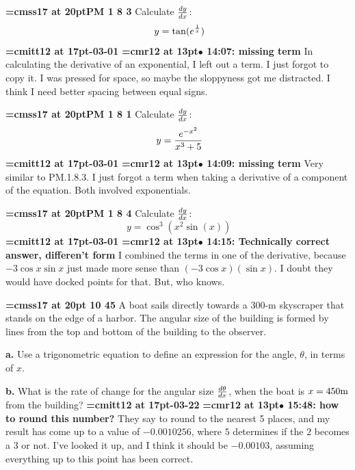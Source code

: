 {\medskip\noindent\bf\font\titlefont=cmss17 at 20pt\titlefont PM 1 8 3}\medskip
Calculate ${dy \over dx}$:
$$\
y = \tan(e^{1 \over x})
$$
{\medskip\noindent\bf\font\titlefont=cmitt12 at 17pt-03-01}\medskip
{\smallskip\noindent\bf\font\titlefont=cmr12 at 13pt\titlefont $\bullet$ 14:07: missing term}\smallskip
In calculating the derivative of an exponential, I left out a term. I just forgot to copy it. I was pressed for space, so maybe the sloppyness got me distracted. I think I need better spacing between equal signs.
\par

{\medskip\noindent\bf\font\titlefont=cmss17 at 20pt\titlefont PM 1 8 1}\medskip
Calculate ${dy \over dx}$:
$$\
y = {
e^{-x^2}
\over
x^3 + 5
}
$$
{\medskip\noindent\bf\font\titlefont=cmitt12 at 17pt-03-01}\medskip
{\smallskip\noindent\bf\font\titlefont=cmr12 at 13pt\titlefont $\bullet$ 14:09: missing term}\smallskip
Very similar to PM.1.8.3. I just forgot a term when taking a derivative of a component of the equation. Both involved exponentials.
\par

{\medskip\noindent\bf\font\titlefont=cmss17 at 20pt\titlefont PM 1 8 4}\medskip
Calculate ${dy \over dx}$:
$$\
y = \cos^3(x^2 \sin(x))
$$
{\medskip\noindent\bf\font\titlefont=cmitt12 at 17pt-03-01}\medskip
{\smallskip\noindent\bf\font\titlefont=cmr12 at 13pt\titlefont $\bullet$ 14:15: Technically correct answer, differen't form}\smallskip
I combined the terms in one of the derivative, because $-3\cos x \sin x$ just made more sense than $(-3 \cos x)(\sin x)$. I doubt they would have docked points for that. But, who knows.
\par

\xrdef{node97}
{\medskip\noindent\bf\font\titlefont=cmss17 at 20pt 10 45}\medskip
A boat sails directly towards a 300-m skyscraper that
stands on the edge of a harbor. The angular size of the building
is formed by lines from the top and bottom of the building
to the observer.
\par {\bf a.}
Use a trigonometric equation to define an expression
for the angle, $\theta$, in terms of $x$.
\par {\bf b.}
What is the rate of change for the angular size ${d\theta \over dx}$,
when the boat is $x = 450 \hbox{m}$ from the building?
{\medskip\noindent\bf\font\titlefont=cmitt12 at 17pt-03-22}\medskip
{\smallskip\noindent\bf\font\titlefont=cmr12 at 13pt\titlefont $\bullet$ 15:48: how to round this number?}\smallskip
They say to round to the nearest 5 places, and my result has come up to a value of $-0.0010256$, where $5$ determines if the $2$ becomes a $3$ or not. I've looked it up, and I think it should be $-0.00103$, assuming everything up to this point has been correct.
\par

